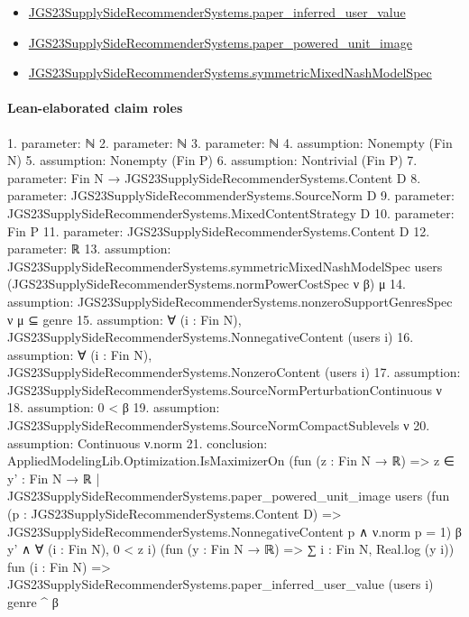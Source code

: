 \documentclass[10pt]{article}
\begin{document}
\begin{itemize}
\item \hyperlink{governing-declaration-48347eafb3702717}{JGS23\allowbreak{}Supply\allowbreak{}Side\allowbreak{}Recommender\allowbreak{}Systems.\allowbreak{}paper\_\allowbreak{}inferred\_\allowbreak{}user\_\allowbreak{}value}
\item \hyperlink{governing-declaration-41ef1ed062d142a1}{JGS23\allowbreak{}Supply\allowbreak{}Side\allowbreak{}Recommender\allowbreak{}Systems.\allowbreak{}paper\_\allowbreak{}powered\_\allowbreak{}unit\_\allowbreak{}image}
\item \hyperlink{paper-prerequisite-b412efba7deb757f}{JGS23\allowbreak{}Supply\allowbreak{}Side\allowbreak{}Recommender\allowbreak{}Systems.\allowbreak{}symmetric\allowbreak{}Mixed\allowbreak{}Nash\allowbreak{}Model\allowbreak{}Spec}
\end{itemize}
\paragraph{Lean-elaborated claim roles}\begin{ReviewVerbatim}
1. parameter: ℕ
2. parameter: ℕ
3. parameter: ℕ
4. assumption: Nonempty (Fin N)
5. assumption: Nonempty (Fin P)
6. assumption: Nontrivial (Fin P)
7. parameter: Fin N → JGS23SupplySideRecommenderSystems.Content D
8. parameter: JGS23SupplySideRecommenderSystems.SourceNorm D
9. parameter: JGS23SupplySideRecommenderSystems.MixedContentStrategy D
10. parameter: Fin P
11. parameter: JGS23SupplySideRecommenderSystems.Content D
12. parameter: ℝ
13. assumption: JGS23SupplySideRecommenderSystems.symmetricMixedNashModelSpec users
  (JGS23SupplySideRecommenderSystems.normPowerCostSpec ν β) μ
14. assumption: JGS23SupplySideRecommenderSystems.nonzeroSupportGenresSpec ν μ ⊆ {genre}
15. assumption: ∀ (i : Fin N), JGS23SupplySideRecommenderSystems.NonnegativeContent (users i)
16. assumption: ∀ (i : Fin N), JGS23SupplySideRecommenderSystems.NonzeroContent (users i)
17. assumption: JGS23SupplySideRecommenderSystems.SourceNormPerturbationContinuous ν
18. assumption: 0 < β
19. assumption: JGS23SupplySideRecommenderSystems.SourceNormCompactSublevels ν
20. assumption: Continuous ν.norm
21. conclusion: AppliedModelingLib.Optimization.IsMaximizerOn
  (fun (z : Fin N → ℝ) =>
    z ∈
        {y' : Fin N → ℝ |
          JGS23SupplySideRecommenderSystems.paper_powered_unit_image users
            (fun (p : JGS23SupplySideRecommenderSystems.Content D) =>
              JGS23SupplySideRecommenderSystems.NonnegativeContent p ∧ ν.norm p = 1)
            β y'} ∧
      ∀ (i : Fin N), 0 < z i)
  (fun (y : Fin N → ℝ) => ∑ i : Fin N, Real.log (y i)) fun (i : Fin N) =>
  JGS23SupplySideRecommenderSystems.paper_inferred_user_value (users i) genre ^ β
\end{ReviewVerbatim}
\end{document}
